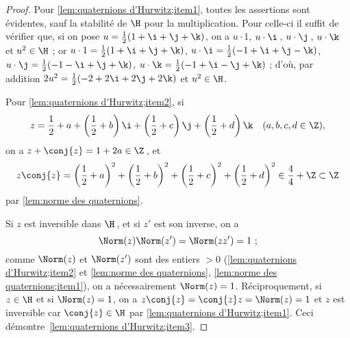 \documentclass[11pt, %
  title in boldface,
  theorem in new line,
  theorem numbering = section,
  number theorems separately,
  simple name,
]{beaulivre}
\begin{document}
    \begin{proof}
        Pour \ref{lem:quaternions d'Hurwitz;item1}, toutes les assertions sont évidentes, sauf la stabilité de \( \H \) pour la multiplication. Pour celle-ci il suffit de vérifier que, si on pose \( u = \frac{1}{2}(1+\i+\j+\k) \), on a \( u \cdot 1 \), \( u \cdot \i \)\,, \( u \cdot \j \)\,, \( u \cdot \k \) et \( u^2 \in \H \) ; or \( u \cdot 1 = \frac{1}{2}(1+\i+\j+\k) \), \( u \cdot \i = \frac{1}{2}(-1+\i+\j-\k) \), \( u \cdot \j = \frac{1}{2}(-1-\i+\j+\k) \), \( u \cdot \k = \frac{1}{2}(-1+\i-\j+\k) \) ; d'où, par addition \( 2u^2 = \frac{1}{2}(-2+2\i+2\j+2\k) \) et \( u^2 \in \H \).

        Pour \ref{lem:quaternions d'Hurwitz;item2}, si
        \[
            z = \frac{1}{2}+a + \left(\frac{1}{2}+b\right) \i + \left(\frac{1}{2}+c\right) \j + \left(\frac{1}{2}+d\right) \k \quad \text{(\( a,b,c,d \in \Z \))},
        \]
        on a \( z + \conj{z} = 1 + 2a \in \Z \)\,, et
        \[
            z \conj{z} = \left(\frac{1}{2}+a\right)^2 + \left(\frac{1}{2}+b\right)^2 + \left(\frac{1}{2}+c\right)^2 + \left(\frac{1}{2}+d\right)^2 \in \frac{4}{4} + \Z \subset \Z
        \]
        par \cref{lem:norme des quaternions}.

        Si \( z \) est inversible dans \( \H \)\,, et si \( z' \) est son inverse, on a
        \[
            \Norm(z)\Norm(z') = \Norm(z z') = 1 ~;
        \]
        comme \( \Norm(z) \) et \( \Norm(z') \) sont des entiers \( > 0 \) (\ref{lem:quaternions d'Hurwitz;item2} et \cref{lem:norme des quaternions}, \ref{lem:norme des quaternions;item1}), on a nécessairement \( \Norm(z) = 1 \). Réciproquement, si \( z \in \H \) et si \( \Norm(z) = 1 \), on a \( z \conj{z} = \conj{z} z = \Norm(z) = 1 \) et \( z \) est inversible car \( \conj{z} \in \H \) par \ref{lem:quaternions d'Hurwitz;item1}. Ceci démontre~\ref{lem:quaternions d'Hurwitz;item3}.


\end{proof}
\end{document}
